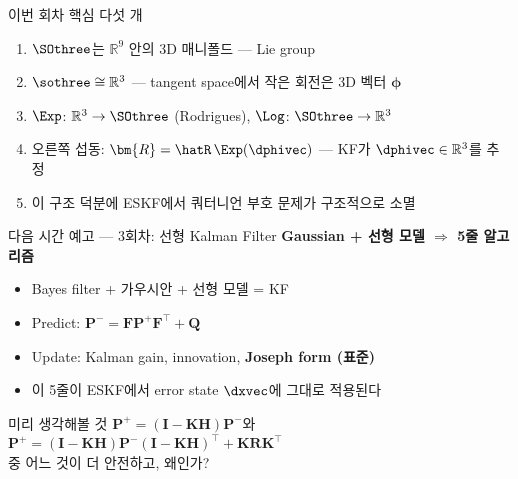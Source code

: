\begin{frame}{이번 회차 핵심 다섯 개}
  \begin{enumerate}
    \item $\SOthree$는 $\mathbb{R}^{9}$ 안의 3D 매니폴드 — Lie group
    \item $\sothree \cong \mathbb{R}^3$ — tangent space에서 작은 회전은 3D 벡터 $\bm{\phi}$
    \item $\Exp$: $\mathbb{R}^3 \to \SOthree$ (Rodrigues), \quad $\Log$: $\SOthree \to \mathbb{R}^3$
    \item 오른쪽 섭동: $\bm{R} = \hatR\,\Exp(\dphivec)$ — KF가 $\dphivec \in \mathbb{R}^3$를 추정
    \item 이 구조 덕분에 ESKF에서 쿼터니언 부호 문제가 구조적으로 소멸
  \end{enumerate}
\end{frame}

\begin{frame}{다음 시간 예고 — 3회차: 선형 Kalman Filter}
  \textbf{Gaussian + 선형 모델 $\Rightarrow$ 5줄 알고리즘}
  \begin{itemize}
    \item Bayes filter + 가우시안 + 선형 모델 = KF
    \item Predict: $\bm{P}^- = \bm{F}\bm{P}^+\bm{F}^\top + \bm{Q}$
    \item Update: Kalman gain, innovation, \textbf{Joseph form (표준)}
    \item 이 5줄이 ESKF에서 error state $\dxvec$에 그대로 적용된다
  \end{itemize}
  \vspace{0.5em}
  \begin{block}{미리 생각해볼 것}
    $\bm{P}^+ = (\bm{I}-\bm{K}\bm{H})\bm{P}^-$와\\
    $\bm{P}^+ = (\bm{I}-\bm{K}\bm{H})\bm{P}^-(\bm{I}-\bm{K}\bm{H})^\top + \bm{K}\bm{R}\bm{K}^\top$\\
    중 어느 것이 더 안전하고, 왜인가?
  \end{block}
\end{frame}

%
%

